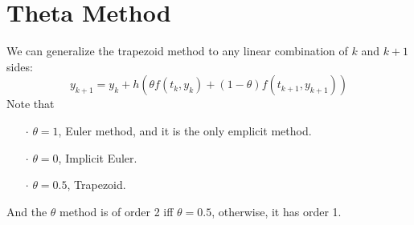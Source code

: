 \documentclass[a4paper, 11pt]{article}
\begin{document}
\section{Theta Method}
We can generalize the trapezoid method to any linear combination of $k$ and $k+1$ sides:
$$
y_{k+1} = y_k + h(\theta f(t_k, y_k) + (1-\theta)f(t_{k+1}, y_{k+1}))
$$
Note that
\begin{itemize}
	\item[$\cdot$] $\theta=1$, Euler method, and it is the only emplicit method.
	\item[$\cdot$] $\theta=0$, Implicit Euler.
	\item[$\cdot$] $\theta=0.5$, Trapezoid.
\end{itemize}
And the $\theta$ method is of order 2 iff $\theta=0.5$, otherwise, it has order 1. 
\end{document}
